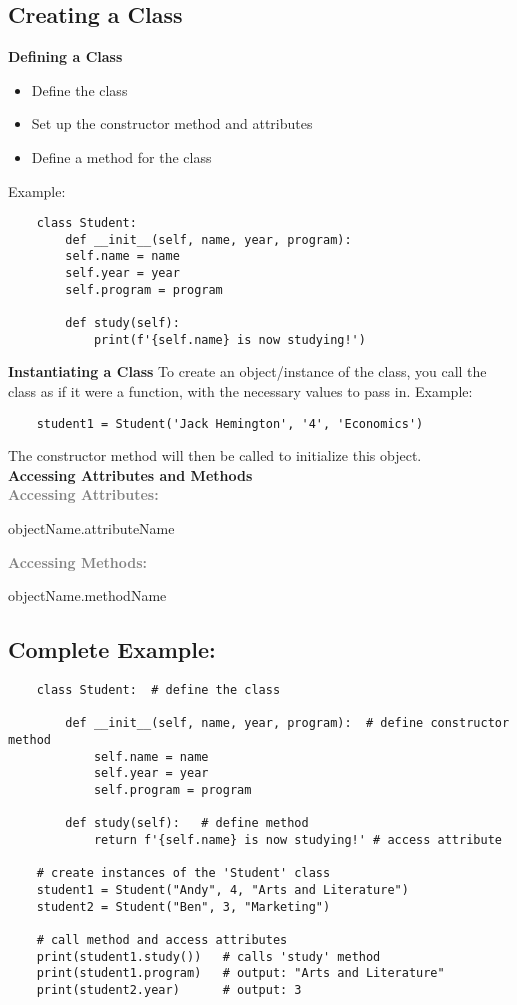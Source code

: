 \subsection{Creating a Class}
\textbf{Defining a Class}
\begin{itemize}
    \item Define the class
    \item Set up the constructor method and attributes
    \item Define a method for the class
\end{itemize}

Example:
\begin{verbatim}
    class Student:
        def __init__(self, name, year, program):
        self.name = name
        self.year = year
        self.program = program

        def study(self):
            print(f'{self.name} is now studying!')
\end{verbatim}
\vspace{0.3cm}
\textbf{Instantiating a Class}
To create an object/instance of the class, you call the class as if it were a function, with the necessary values to pass in.
Example:
\begin{verbatim}
    student1 = Student('Jack Hemington', '4', 'Economics')
\end{verbatim}
The constructor method will then be called to initialize this object.
\\[0.5cm]
\textbf{Accessing Attributes and Methods}\\
\textbf{\textcolor{gray}{Accessing Attributes:}}\\
\begin{center}
    objectName.attributeName
\end{center}

\textbf{\textcolor{gray}{Accessing Methods:}}
\begin{center}
    objectName.methodName
\end{center}
\subsection{Complete Example:}
\begin{verbatim}
    class Student:  # define the class

        def __init__(self, name, year, program):  # define constructor method
            self.name = name
            self.year = year
            self.program = program
    
        def study(self):   # define method
            return f'{self.name} is now studying!' # access attribute

    # create instances of the 'Student' class
    student1 = Student("Andy", 4, "Arts and Literature")
    student2 = Student("Ben", 3, "Marketing")

    # call method and access attributes
    print(student1.study())   # calls 'study' method
    print(student1.program)   # output: "Arts and Literature"
    print(student2.year)      # output: 3
    
\end{verbatim}

